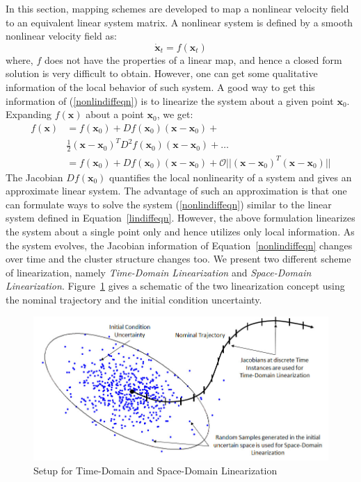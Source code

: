 In this section, mapping schemes are developed to map a nonlinear velocity field to an equivalent linear system matrix. A nonlinear system is defined by a smooth nonlinear velocity field as:
\begin{equation}
\label{nonlindiffeqn}
\dot{\mathbf{x}}_t = f(\mathbf{x}_t )
\end{equation}
where, $f$ does not have the properties of a linear map, and hence a closed form solution is very difficult to obtain. However, one can get some qualitative information of the local behavior of such system.  A good way to get this information of (\ref{nonlindiffeqn}) is to linearize the system about a given point $\mathbf{x}_0$. Expanding $f(\mathbf{x})$ about a point $\mathbf{x}_0$, we get:
\begin{equation}
\label{taylor}
\begin{array}{rl}
f(\mathbf{x}) &= f(\mathbf{x}_0) + Df(\mathbf{x}_0)(\mathbf{x}  - \mathbf{x}_0) + \\ 
&\frac{1}{2} (\mathbf{x}  - \mathbf{x}_0)^T D^2f(\mathbf{x}_0)(\mathbf{x}  - \mathbf{x}_0) + \ldots \\
& = f(\mathbf{x}_0) + Df(\mathbf{x}_0)(\mathbf{x}  - \mathbf{x}_0) + \mathcal{O} ||(\mathbf{x}  - \mathbf{x}_0)^T(\mathbf{x}  - \mathbf{x}_0)||
\end{array}
\end{equation}
The Jacobian $Df(\mathbf{x}_0)$ quantifies the local nonlinearity of a system and gives an approximate linear system. The advantage of such an approximation is that one can formulate ways to solve the system (\ref{nonlindiffeqn}) similar to the linear system defined in Equation~\ref{lindiffeqn}. However, the above formulation linearizes the system about a single point only and hence utilizes only local information. As the system evolves, the Jacobian information of Equation~\ref{nonlindiffeqn} changes over time and the cluster structure changes too. We present two different scheme of linearization, namely \textit{Time-Domain Linearization} and \textit{Space-Domain Linearization}. Figure~\ref{fig_lin} gives a schematic of the two linearization concept using the nominal trajectory and the initial condition uncertainty. 

\begin{figure}[H]
\centering
\includegraphics[width=\textwidth]{figures/FIG_3}
\caption{Setup for Time-Domain and Space-Domain Linearization}
\label{fig_lin}
\end{figure}

